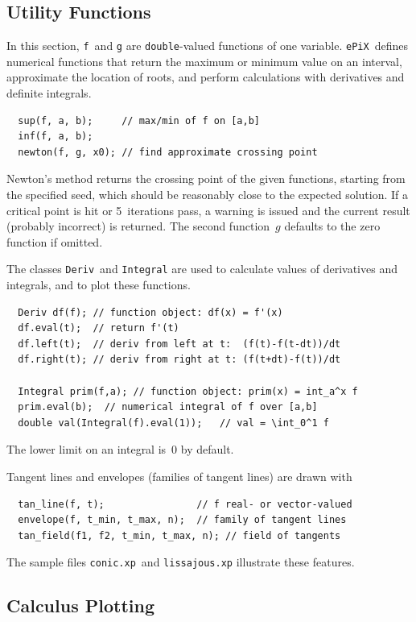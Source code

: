 \documentclass[12pt]{report}
\newcommand{\code}[1]{\texttt{#1}}
\newcommand{\filename}[1]{\texttt{#1}}
\newcommand{\ePiX}{\code{ePiX}}
\begin{document}
\subsection*{Utility Functions}

In this section, \code{f}~and \code{g} are \code{double}-valued
functions of one variable. \ePiX\ defines numerical functions that
return the maximum or minimum value on an interval, approximate the
location of roots, and perform calculations with derivatives and
definite integrals.
\begin{verbatim}
  sup(f, a, b);     // max/min of f on [a,b]
  inf(f, a, b);
  newton(f, g, x0); // find approximate crossing point
\end{verbatim}
Newton's method returns the crossing point of the given functions,
starting from the specified seed, which should be reasonably close to
the expected solution. If a critical point is hit or 5~iterations
pass, a warning is issued and the current result (probably incorrect)
is returned. The second function~$g$ defaults to the zero function if
omitted.

The classes \code{Deriv}~and \code{Integral} are used to calculate
values of derivatives and integrals, and to plot these functions.
\begin{verbatim}
  Deriv df(f); // function object: df(x) = f'(x)
  df.eval(t);  // return f'(t)
  df.left(t);  // deriv from left at t:  (f(t)-f(t-dt))/dt
  df.right(t); // deriv from right at t: (f(t+dt)-f(t))/dt

  Integral prim(f,a); // function object: prim(x) = int_a^x f
  prim.eval(b);  // numerical integral of f over [a,b]
  double val(Integral(f).eval(1));   // val = \int_0^1 f
\end{verbatim}
The lower limit on an integral is~0 by default.

Tangent lines and envelopes (families of tangent lines) are drawn with
\begin{verbatim}
  tan_line(f, t);                // f real- or vector-valued
  envelope(f, t_min, t_max, n);  // family of tangent lines
  tan_field(f1, f2, t_min, t_max, n); // field of tangents
\end{verbatim}
The sample files \filename{conic.xp}~and \filename{lissajous.xp}
illustrate these features.


\subsection*{Calculus Plotting} 
\end{document}

